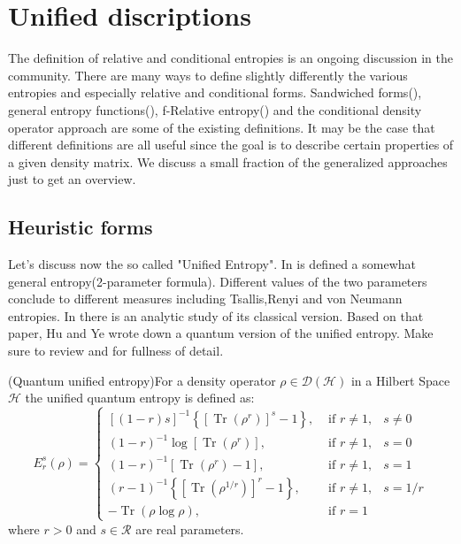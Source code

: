 \section{Unified discriptions}
The definition of relative and conditional entropies is an ongoing discussion in the community. There are many ways to define slightly differently the various entropies and especially relative and conditional forms. Sandwiched forms(\cite{muller2013quantum}), general entropy functions(\citep{rossignoli2010generalized}), f-Relative entropy(\cite{hayashi2016quantum}) and the conditional density operator approach are some of the existing definitions. It may be the case that different definitions are all useful since the goal is to describe certain properties of a given density matrix. We discuss a small fraction of the generalized approaches just to get an overview.
\subsection{Heuristic forms}
Let's discuss now the so called "Unified Entropy". In \cite{hu2006generalized} is defined a somewhat general entropy(2-parameter formula). Different values of the two parameters conclude to different measures including Tsallis,Renyi and von Neumann entropies.
In \cite{rathie1991unified} there is an analytic study of its classical version. Based on that paper, Hu and Ye wrote down a quantum version of the unified entropy. Make sure to review \citep{hu2006generalized} and \cite{muller2013quantum} for fullness of detail.
\begin{definition}(Quantum unified entropy)For a density operator $\rho \in \mathcal{D}(\mathcal{H})$ in a Hilbert Space $\mathcal{H}$ the unified quantum entropy is defined as:
\begin{equation}
E_{r}^{s}(\rho)=\left\{\begin{array}{lll}
[(1-r) s]^{-1}\left\{\left[\operatorname{Tr}\left(\rho^{r}\right)\right]^{s}-1\right\}, & \text { if } r \neq 1, & s \neq 0 \\
(1-r)^{-1} \log \left[\operatorname{Tr}\left(\rho^{r}\right)\right], & \text { if } r \neq 1, & s=0 \\
(1-r)^{-1}\left[\operatorname{Tr}\left(\rho^{r}\right)-1\right],
 & \text { if } r \neq 1, & s=1 \\
(r-1)^{-1}\left\{\left[\operatorname{Tr}\left(\rho^{1 / r}\right)\right]^{r}-1\right\},& \text { if } r \neq 1, & s=1 / r \\
-\operatorname{Tr}(\rho \log \rho), & \text { if } r=1
\end{array}\right.
\end{equation}
where $r>0$ and $s \in \mathcal{R}$ are real parameters.
\end{definition}
